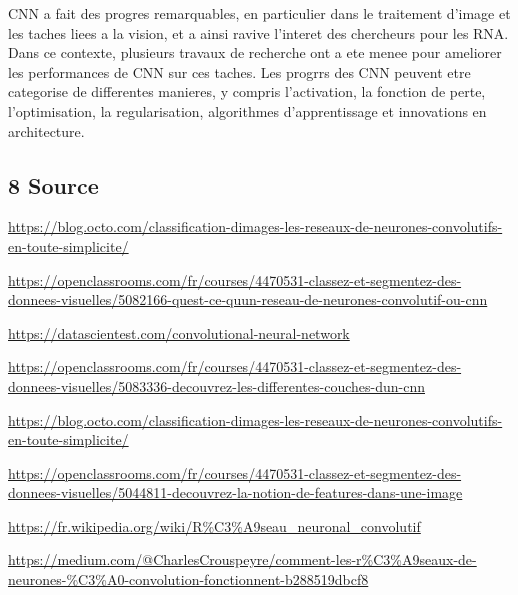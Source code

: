 \documentclass[]{article}
\begin{document}
CNN a fait des progres remarquables, en particulier dans le traitement
d'image et les taches liees a la vision, et a ainsi ravive l'interet des
chercheurs pour les RNA. Dans ce contexte, plusieurs travaux de
recherche ont a ete menee pour ameliorer les performances de CNN sur ces
taches. Les progrrs des CNN peuvent etre categorise de differentes
manieres, y compris l'activation, la fonction de perte, l'optimisation,
la regularisation, algorithmes d'apprentissage et innovations en
architecture.

\subsection{8 Source}\label{source}

\url{https://blog.octo.com/classification-dimages-les-reseaux-de-neurones-convolutifs-en-toute-simplicite/}

\url{https://openclassrooms.com/fr/courses/4470531-classez-et-segmentez-des-donnees-visuelles/5082166-quest-ce-quun-reseau-de-neurones-convolutif-ou-cnn}

\url{https://datascientest.com/convolutional-neural-network}

\url{https://openclassrooms.com/fr/courses/4470531-classez-et-segmentez-des-donnees-visuelles/5083336-decouvrez-les-differentes-couches-dun-cnn}

\url{https://blog.octo.com/classification-dimages-les-reseaux-de-neurones-convolutifs-en-toute-simplicite/}

\url{https://openclassrooms.com/fr/courses/4470531-classez-et-segmentez-des-donnees-visuelles/5044811-decouvrez-la-notion-de-features-dans-une-image}

\url{https://fr.wikipedia.org/wiki/R\%C3\%A9seau_neuronal_convolutif}

\url{https://medium.com/@CharlesCrouspeyre/comment-les-r\%C3\%A9seaux-de-neurones-\%C3\%A0-convolution-fonctionnent-b288519dbcf8}
\end{document}
